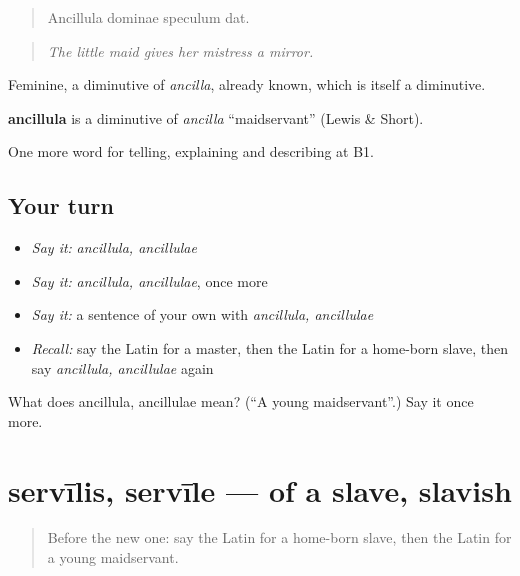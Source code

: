 \begin{quote}
Ancillula dominae speculum dat.
\end{quote}

\begin{quote}
\emph{The little maid gives her mistress a mirror.}
\end{quote}

Feminine, a diminutive of \emph{ancilla}, already known, which is itself a diminutive.

\begin{cousinweb}
\textbf{ancillula} is a diminutive of \emph{ancilla} \textquotedblleft{}maidservant\textquotedblright{} (Lewis \& Short).
\end{cousinweb}

\begin{grammarlens}[title={What you've built}]
One more word for telling, explaining and describing at B1.
\end{grammarlens}

\subsection*{Your turn}
\begin{itemize}
\raggedright
  \item \emph{Say it:} \emph{ancillula, ancillulae}
  \item \emph{Say it:} \emph{ancillula, ancillulae}, once more
  \item \emph{Say it:} a sentence of your own with \emph{ancillula, ancillulae}
  \item \emph{Recall:} say the Latin for a master, then the Latin for a home-born slave, then say \emph{ancillula, ancillulae} again
\end{itemize}

\begin{tcolorbox}[breakable,colback=teal!4,colframe=teal!35!black,title={Before you move on}]
What does ancillula, ancillulae mean? (\textquotedblleft{}A young maidservant\textquotedblright{}.) Say it once more.
\end{tcolorbox}
\section[servīlis, servīle]{servīlis, servīle — of a slave, slavish}

\label{lesson:LA-C530-servilis}



\begin{quote}
Before the new one: say the Latin for a home-born slave, then the Latin for a young maidservant.
\end{quote}

